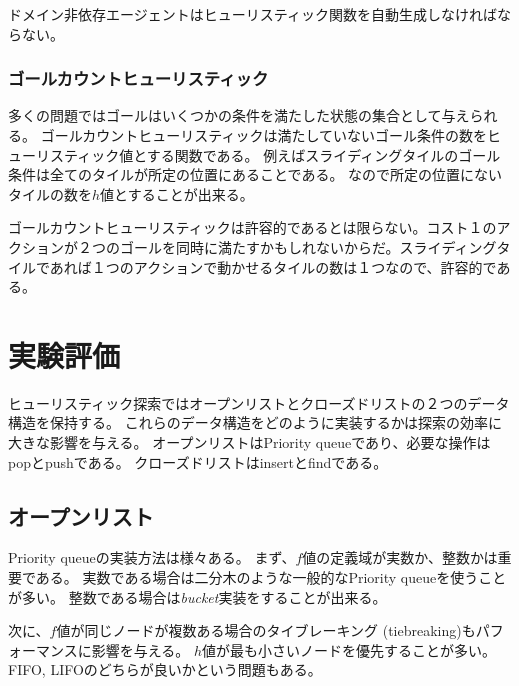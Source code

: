 \documentclass[b5paper]{report}
\begin{document}
ドメイン非依存エージェントはヒューリスティック関数を自動生成しなければならない。

\subsection{ゴールカウントヒューリスティック}

多くの問題ではゴールはいくつかの条件を満たした状態の集合として与えられる。
ゴールカウントヒューリスティックは満たしていないゴール条件の数をヒューリスティック値とする関数である。
例えばスライディングタイルのゴール条件は全てのタイルが所定の位置にあることである。
なので所定の位置にないタイルの数を$h$値とすることが出来る。

ゴールカウントヒューリスティックは許容的であるとは限らない。コスト１のアクションが２つのゴールを同時に満たすかもしれないからだ。スライディングタイルであれば１つのアクションで動かせるタイルの数は１つなので、許容的である。


\chapter{実験評価}
\label{ch:search-performance}
ヒューリスティック探索ではオープンリストとクローズドリストの２つのデータ構造を保持する。
これらのデータ構造をどのように実装するかは探索の効率に大きな影響を与える。
オープンリストはPriority queueであり、必要な操作はpopとpushである。
クローズドリストはinsertとfindである。

\section{オープンリスト}
\label{sec:open-list}
Priority queueの実装方法は様々ある。
まず、$f$値の定義域が実数か、整数かは重要である。
実数である場合は二分木のような一般的なPriority queueを使うことが多い。
整数である場合は{\it bucket}実装をすることが出来る。

次に、$f$値が同じノードが複数ある場合のタイブレーキング (tiebreaking)もパフォーマンスに影響を与える。
$h$値が最も小さいノードを優先することが多い。
FIFO, LIFOのどちらが良いかという問題もある。

\end{document}
